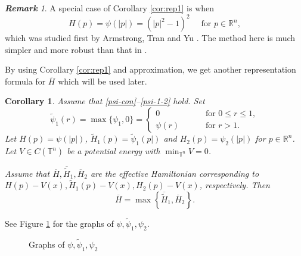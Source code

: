 \documentclass[12pt,reqno]{amsart}
\theoremstyle{plain}
\newtheorem{cor}[thm]{Corollary}
\theoremstyle{remark}
\newtheorem{rem}{\bf{Remark}}
\numberwithin{equation}{section}
\newcommand{\R}{\mathbb{R}}
\newcommand{\T}{\mathbb{T}}
\newcommand{\ol}{\overline}
\begin{document}
\begin{rem}
A special case of Corollary \ref{cor:rep1} is when
\[
H(p)=\psi(|p|)= \left(|p|^2-1\right)^2 \quad \text{ for } p \in \R^n,
\]
which was studied first by Armstrong, Tran and Yu \cite{ATY1}.
The method here is much simpler and more robust than that in \cite{ATY1}.
\end{rem}

By using Corollary \ref{cor:rep1} and approximation, we get another representation formula for $\ol{H}$ which will be used later.

\begin{cor}\label{cor:rep2}
Assume that \eqref{psi-con}--\eqref{psi-1-2} hold.
Set
\[
\tilde \psi_1(r)=\max\{\psi_1,0\}=
\begin{cases}
0 \qquad &\text{ for } 0\leq r \leq 1,\\
\psi(r) \qquad &\text{ for } r>1.
\end{cases}
\]
Let $H(p)=\psi(|p|)$, $\tilde H_1(p)=\tilde \psi_1(p|)$ and $H_2(p)=\psi_2(|p|)$ for  $p \in \R^n$.
Let $V \in C(\T^n)$ be a potential energy with $\min_{\T^n} V=0$.

Assume that $\ol{H},\ol{\tilde H}_1, \ol{H}_2$ are the effective Hamiltonian corresponding to $H(p)-V(x), \tilde H_1(p)- V(x), H_2(p)-V(x)$, respectively.
Then
\[
\ol{H} = \max\left\{\ol{\tilde H}_1, \ol{H}_2\right\}.
\]
\end{cor}
\noindent See Figure \ref{fig2} for the graphs of $\psi, \tilde \psi_1, \psi_2$.
\begin{figure}[h]
\begin{center}
\caption{Graphs of $\psi, \tilde \psi_1, \psi_2$}
\label{fig2}
\end{center}
\end{figure}
\end{document}
